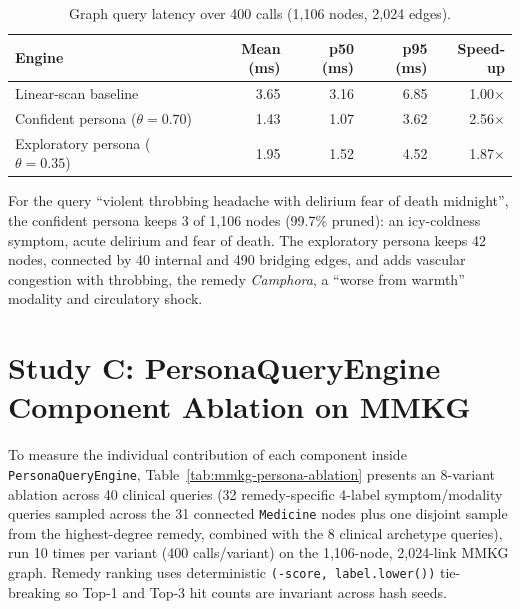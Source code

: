 \documentclass[12pt,a4paper,oneside]{report}
\newcommand{\code}[1]{\texttt{\small #1}}
\begin{document}
\begin{table}[H]
\centering
\caption{Graph query latency over 400 calls (1,106 nodes, 2,024 edges).}
\label{tab:persona}
\small
\begin{tabular}{@{}lrrrr@{}}
\toprule
Engine & Mean (ms) & p50 (ms) & p95 (ms) & Speed-up\\
\midrule
Linear-scan baseline & 3.65 & 3.16 & 6.85 & 1.00$\times$\\
Confident persona ($\theta = 0.70$) & 1.43 & 1.07 & 3.62 & 2.56$\times$\\
Exploratory persona ($\theta = 0.35$) & 1.95 & 1.52 & 4.52 & 1.87$\times$\\
\bottomrule
\end{tabular}
\end{table}

For the query ``violent throbbing headache with delirium fear of death midnight'', the confident persona keeps 3 of 1,106 nodes (99.7\% pruned): an icy-coldness symptom, acute delirium and fear of death. The exploratory persona keeps 42 nodes, connected by 40 internal and 490 bridging edges, and adds vascular congestion with throbbing, the remedy \emph{Camphora}, a ``worse from warmth'' modality and circulatory shock.

\section{Study C: PersonaQueryEngine Component Ablation on MMKG}\label{sec:study-c}
To measure the individual contribution of each component inside \code{PersonaQueryEngine}, Table~\ref{tab:mmkg-persona-ablation} presents an 8-variant ablation across 40 clinical queries (32 remedy-specific 4-label symptom/modality queries sampled across the 31 connected \code{Medicine} nodes plus one disjoint sample from the highest-degree remedy, combined with the 8 clinical archetype queries), run 10 times per variant (400 calls/variant) on the 1{,}106-node, 2{,}024-link MMKG graph. Remedy ranking uses deterministic \code{(-score, label.lower())} tie-breaking so Top-1 and Top-3 hit counts are invariant across hash seeds.
\end{document}
